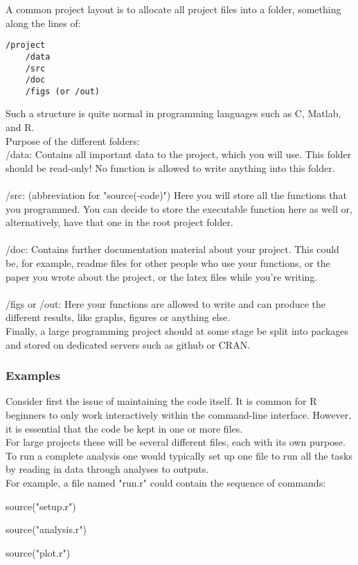\documentclass[12pt,a4paper]{article}
\theoremstyle{regla}
\theoremstyle{remark}
\theoremstyle{definition}
\theoremstyle{nonumberbreak}
\begin{document}
A common project layout is to allocate all project files into a folder, something along the lines of:
\begin{verbatim}
/project
	/data
	/src
	/doc
	/figs (or /out)
\end{verbatim}
Such a structure is quite normal in programming languages such as C, Matlab, and R.\\

Purpose of the different folders:\\

/data: Contains all important data to the project, which you will use. This folder should be read-only! No function is allowed to write anything into this folder. \\\\
/src:   (abbreviation for "source(-code)") Here you will store all the functions that you programmed. You can decide to store the executable function here as well or, alternatively, have that one in the root project folder. \\\\
/doc:  Contains further documentation material about your project. This could be, for example, readme files for other people who use your functions, or the paper you wrote about the project, or the latex files while you're writing.\\\\
/figs or /out: Here your functions are allowed to write and can produce the different results, like graphs, figures or anything else. \\

Finally, a large programming project should at some stage be split into packages and stored on dedicated servers such as github or CRAN.

\subsubsection{Examples}
\begin{xmpl}
Consider first the issue of maintaining the code itself. It is common for R beginners to only work interactively within the command-line interface. 
However, it is essential that the code be kept in one or more files.\\

For large projects these will be several different files, each with its own purpose. To run a complete analysis one would typically set up one file to run all the tasks by reading in data through analyses to 
outputs.\\

For example, a file named "run.r" could contain the sequence of commands:

\begin{description}
\item source("setup.r")
\item source("analysis.r")
\item source("plot.r")
\end{description}

\end{xmpl}
\end{document}
